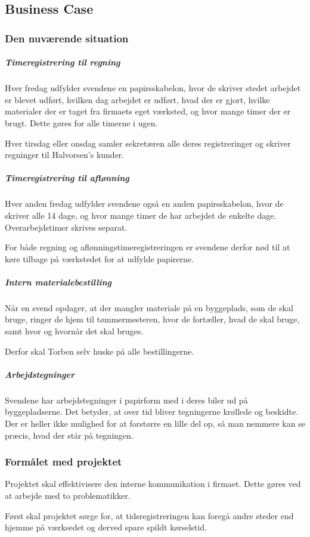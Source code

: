 \subsection{Business Case}
\subsubsection{Den nuværende situation}
\subparagraph{Timeregistrering til regning}

    Hver fredag udfylder svendene en papirsskabelon, hvor de skriver stedet arbejdet er blevet udført, hvilken dag arbejdet er udført, hvad der er gjort, hvilke materialer der er taget fra firmaets eget værksted, og hvor mange timer der er brugt.
    Dette gøres for alle timerne i ugen.
    
    Hver tirsdag eller onsdag samler sekretæren alle deres registreringer og skriver regninger til Halvorsen's kunder.

\subparagraph{Timeregistrering til aflønning}
    Hver anden fredag udfylder svendene også en anden papirsskabelon, hvor de skriver alle 14 dage, og hvor mange timer de har arbejdet de enkelte dage. Overarbejdstimer skrives separat.
    
    For både regning og aflønningstimeregistreringen er svendene derfor nød til at køre tilbage på værkstedet for at udfylde papirerne.
    
\subparagraph{Intern materialebestilling}
    Når en svend opdager, at der mangler materiale på en byggeplads, som de skal bruge, ringer de hjem til tømmermesteren, hvor de fortæller, hvad de skal bruge, samt hvor og hvornår det skal bruges.
    
    Derfor skal Torben selv huske på alle bestillingerne.
    
\subparagraph{Arbejdstegninger}
    Svendene har arbejdstegninger i papirform med i deres biler ud på byggepladserne.
    Det betyder, at over tid bliver tegningerne krøllede og beskidte.
    Der er heller ikke mulighed for at forstørre en lille del op, så man nemmere kan se præcis, hvad der står på tegningen.
    
\subsubsection{Formålet med projektet}
    Projektet skal effektivisere den interne kommunikation i     firmaet.
    Dette gøres ved at arbejde med to problematikker.
    
    Først skal projektet sørge for, at tidsregistreringen kan foregå andre steder end hjemme på værksedet og derved spare spildt kørselstid.
    
